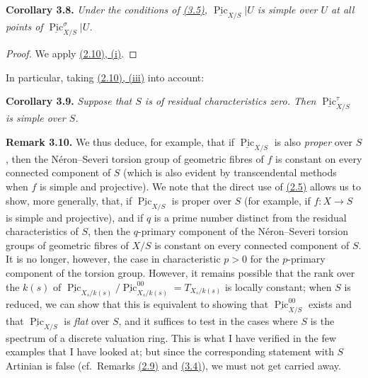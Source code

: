 \documentclass{article}
\newenvironment{itenv}[1]
  {\phantomsection\par\smallskip\noindent\textbf{#1.}\itshape}
  {\par\smallskip}
\newenvironment{rmenv}[1]
  {\phantomsection\par\smallskip\noindent\textbf{#1.}\rmfamily}
  {\par\smallskip}
\theoremstyle{definition}
\theoremstyle{definition}
\theoremstyle{definition}
\theoremstyle{definition}
\theoremstyle{remark}
\begin{document}
\leavevmode{}%
\begin{itenv}{Corollary 3.8}
Under the conditions of \protect\hyperlink{fga-3-vi-theorem-3.5}{(3.5)}, \(\underline{\operatorname{Pic}}_{X/S}|U\) is simple over \(U\) at all points of \(\underline{\operatorname{Pic}}_{X/S}^\sigma|U\).

\end{itenv}

\begin{proof}
We apply \protect\hyperlink{fga-3-vi-proposition-2.10}{(2.10), (i)}.
\end{proof}

In particular, taking \protect\hyperlink{fga-3-vi-proposition-2.10}{(2.10), (iii)} into account:

\leavevmode{}%
\begin{itenv}{Corollary 3.9}
Suppose that \(S\) is of residual characteristics zero.
Then \(\underline{\operatorname{Pic}}_{X/S}^\tau\) is simple over \(S\).

\end{itenv}

\leavevmode{}%
\begin{rmenv}{Remark 3.10}
We thus deduce, for example, that if \(\underline{\operatorname{Pic}}_{X/S}\) is also \emph{proper} over \(S\), then the Néron--Severi torsion group of geometric fibres of \(f\) is constant on every connected component of \(S\) (which is also evident by transcendental methods when \(f\) is simple and projective).
We note that the direct use of \protect\hyperlink{fga-3-vi-theorem-2.5}{(2.5)} allows us to show, more generally, that, if \(\underline{\operatorname{Pic}}_{X/S}\) is proper over \(S\) (for example, if \(f\colon X\to S\) is simple and projective), and if \(q\) is a prime number distinct from the residual characteristics of \(S\), then the \(q\)-primary component of the Néron--Severi torsion groups of geometric fibres of \(X/S\) is constant on every connected component of \(S\).
It is no longer, however, the case in characteristic \(p>0\) for the \(p\)-primary component of the torsion group.
However, it remains possible that the rank over the \(k(s)\) of \(\underline{\operatorname{Pic}}_{X_s/k(s)}/\underline{\operatorname{Pic}}_{X_s/k(s)}^{00}=T_{X_s/k(s)}\) is locally constant;
when \(S\) is reduced, we can show that this is equivalent to showing that \(\underline{\operatorname{Pic}}_{X/S}^{00}\) exists and that \(\underline{\operatorname{Pic}}_{X/S}\) is \emph{flat} over \(S\), and it suffices to test in the cases where \(S\) is the spectrum of a discrete valuation ring.
This is what I have verified in the few examples that I have looked at;
but since the corresponding statement with \(S\) Artinian is false (cf.~Remarks \protect\hyperlink{fga-3-vi-remark-2.9}{(2.9)} and \protect\hyperlink{fga-3-vi-remarks-3.4}{(3.4)}), we must not get carried away.

\end{rmenv}
\end{document}
